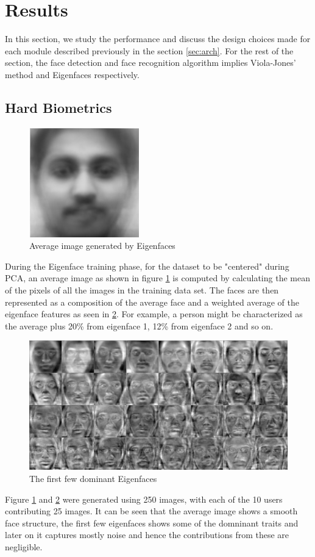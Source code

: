 \documentclass[%
        final,
        internal,
        notitlepage,
        narroweqnarray,
        inline,
        ]{ieee}
\begin{document}
\section{Results} \label{sec:results}
In this section, we study the performance and discuss the design choices made for each module described previously in the section \ref{sec:arch}.
For the rest of the section, the face detection and face recognition algorithm implies Viola-Jones' method and Eigenfaces respectively.

\subsection{Hard Biometrics}
\begin{figure}[h!]
	\centering
	\includegraphics[scale=0.5]{img/avg.jpeg}
	\caption{Average image generated by Eigenfaces}
	\label{fig:avg}
\end{figure}
During the Eigenface training phase, for the dataset to be "centered" during PCA, an average image as shown in figure \ref{fig:avg} is computed by calculating the mean of the pixels of all the images in the training data set. 
The faces are then represented as a composition of the average face and a weighted average of the eigenface features as seen in \ref{fig:eigen}.
For example, a person might be characterized as the average plus 20\% from eigenface 1, 12\% from eigenface 2 and so on.
\begin{figure}[h!]
	\centering
	\includegraphics[scale=0.15]{img/eigen.png}
	\caption{The first few dominant Eigenfaces}
	\label{fig:eigen}
\end{figure}
Figure \ref{fig:avg} and \ref{fig:eigen} were generated using 250 images, with each of the 10 users contributing 25 images.
It can be seen that the average image shows a smooth face structure, the first few eigenfaces shows some of the domninant traits and later on it captures mostly noise and hence the contributions from these are negligible.
\end{document}
